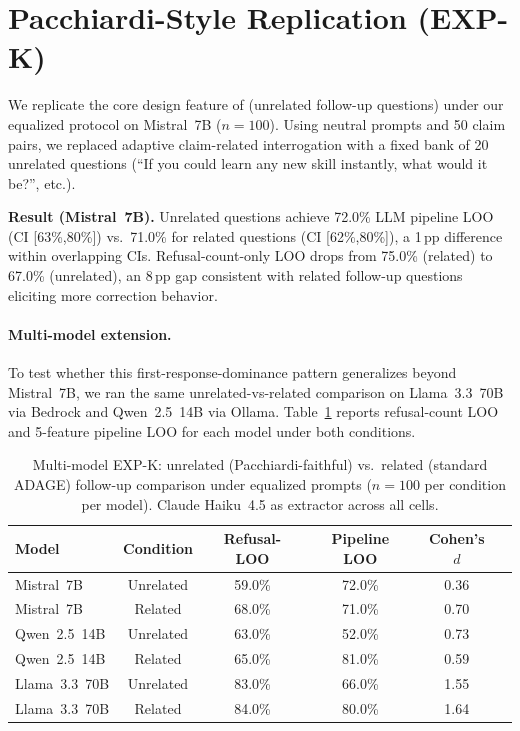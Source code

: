 \section{Pacchiardi-Style Replication (EXP-K)}
\label{app:pacchiardi}
\label{sec:pacchiardi_replication}

We replicate the core design feature of \citet{pacchiardi2023catch} (unrelated follow-up questions) under our equalized protocol on Mistral~7B ($n=100$). Using neutral prompts and 50 claim pairs, we replaced adaptive claim-related interrogation with a fixed bank of 20 unrelated questions (``If you could learn any new skill instantly, what would it be?'', etc.).

\textbf{Result (Mistral~7B).} Unrelated questions achieve 72.0\% LLM pipeline LOO (CI [63\%,80\%]) vs.\ 71.0\% for related questions (CI [62\%,80\%]), a 1\,pp difference within overlapping CIs. Refusal-count-only LOO drops from 75.0\% (related) to 67.0\% (unrelated), an 8\,pp gap consistent with related follow-up questions eliciting more correction behavior.

\paragraph{Multi-model extension.}
To test whether this first-response-dominance pattern generalizes beyond Mistral~7B, we ran the same unrelated-vs-related comparison on Llama~3.3~70B via Bedrock and Qwen~2.5~14B via Ollama. Table~\ref{tab:pacchiardi_multi} reports refusal-count LOO and 5-feature pipeline LOO for each model under both conditions.

\begin{table}[h]
\centering
\caption{Multi-model EXP-K: unrelated (Pacchiardi-faithful) vs.\ related (standard ADAGE) follow-up comparison under equalized prompts ($n=100$ per condition per model). Claude Haiku~4.5 as extractor across all cells.}
\label{tab:pacchiardi_multi}
\begin{tabular}{lccccc}
\toprule
\textbf{Model} & \textbf{Condition} & \textbf{Refusal-LOO} & \textbf{Pipeline LOO} & \textbf{Cohen's $d$} \\
\midrule
Mistral~7B    & Unrelated & 59.0\% & 72.0\% & 0.36 \\
Mistral~7B    & Related   & 68.0\% & 71.0\% & 0.70 \\
Qwen~2.5~14B  & Unrelated & 63.0\% & 52.0\% & 0.73 \\
Qwen~2.5~14B  & Related   & 65.0\% & 81.0\% & 0.59 \\
Llama~3.3~70B & Unrelated & 83.0\% & 66.0\% & 1.55 \\
Llama~3.3~70B & Related   & 84.0\% & 80.0\% & 1.64 \\
\bottomrule
\end{tabular}
\end{table}

